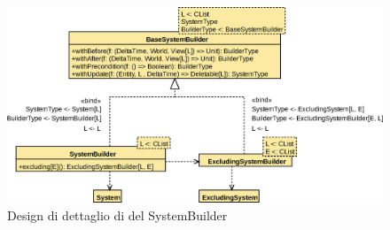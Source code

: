 \begin{figure}[H]
    \centering
    \includegraphics[width=\textwidth]{./img/SystemBuilder}
    \caption{Design di dettaglio di del SystemBuilder}
    \label{fig:system-builder}
\end{figure}

